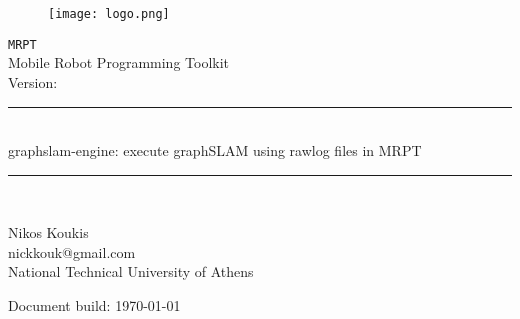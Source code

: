 \newcommand{\horrule}[1]{\rule{\linewidth}{#1}} %

\begin{titlepage}

\begin{center}
\begin{figure}[htpb]
    \begin{center}
        \texttt{[image: logo.png]} %
    \end{center}
\end{figure}

\vspace*{10mm}
\normalfont\large
\texttt{MRPT}\\
Mobile Robot Programming Toolkit\\
Version: \MRPTVERSION

\vspace*{10mm}

\horrule{0.5pt} \\[0.4cm] %
\LARGE graphslam-engine: execute graphSLAM using rawlog files in MRPT
\horrule{2pt} \\[0.5cm] %
\vspace*{10mm}

\normalfont\large
Nikos Koukis\\
nickkouk@gmail.com\\
National Technical University of Athens\\
\vspace*{10mm}
\vfill

Document build: \today


\end{center}
\end{titlepage}
